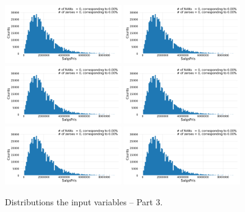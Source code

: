 \begin{figure}
  \subfloat{\qquad}
  \includegraphics[draft=false, width=0.45\textwidth, page=31, trim=15 0 15 0, clip]{figures/housing/overview_fig.pdf}\hfil
  \subfloat{\qquad}
  \includegraphics[draft=false, width=0.45\textwidth, page=32, trim=15 0 15 0, clip]{figures/housing/overview_fig.pdf}
  \subfloat{\qquad}
  \includegraphics[draft=false, width=0.45\textwidth, page=33, trim=15 0 15 0, clip]{figures/housing/overview_fig.pdf}\hfil
  \subfloat{\qquad}
  \includegraphics[draft=false, width=0.45\textwidth, page=34, trim=15 0 15 0, clip]{figures/housing/overview_fig.pdf}
  \subfloat{\qquad}
  \includegraphics[draft=false, width=0.45\textwidth, page=35, trim=15 0 15 0, clip]{figures/housing/overview_fig.pdf}\hfil
  \subfloat{\qquad}
  \includegraphics[draft=false, width=0.45\textwidth, page=36, trim=15 0 15 0, clip]{figures/housing/overview_fig.pdf}
  \caption[Distributions of the Input Variables -- Part 3]{Distributions the input variables -- Part 3.}
  \label{fig:h:variable_overview_all_3}
  \vspace{\abovecaptionskip}
\end{figure}

